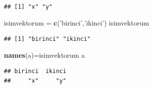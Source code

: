 \documentclass[]{book}
\newenvironment{Shaded}{\begin{snugshade}}{\end{snugshade}}
\newcommand{\KeywordTok}[1]{\textcolor[rgb]{0.13,0.29,0.53}{\textbf{#1}}}
\newcommand{\NormalTok}[1]{#1}
\newcommand{\StringTok}[1]{\textcolor[rgb]{0.31,0.60,0.02}{#1}}
\begin{document}
\begin{verbatim}
## [1] "x" "y"
\end{verbatim}

\begin{Shaded}
\begin{Highlighting}[]
\NormalTok{isimvektorum =}\StringTok{ }\KeywordTok{c}\NormalTok{(}\StringTok{'birinci'}\NormalTok{,}\StringTok{'ikinci'}\NormalTok{)}
\NormalTok{isimvektorum}
\end{Highlighting}
\end{Shaded}

\begin{verbatim}
## [1] "birinci" "ikinci"
\end{verbatim}

\begin{Shaded}
\begin{Highlighting}[]
\KeywordTok{names}\NormalTok{(a)=isimvektorum}
\NormalTok{a}
\end{Highlighting}
\end{Shaded}

\begin{verbatim}
## birinci  ikinci 
##     "x"     "y"
\end{verbatim}


\end{document}
